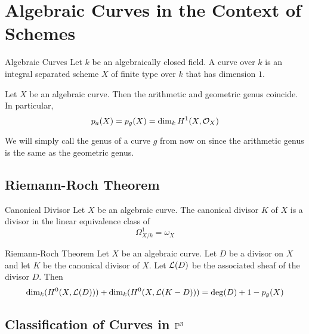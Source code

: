 \documentclass[a4paper]{article}
\begin{document}
\pagebreak
\section{Algebraic Curves in the Context of Schemes}
\begin{defn}{Algebraic Curves}{} Let $k$ be an algebraically closed field. A curve over $k$ is an integral separated scheme $X$ of finite type over $k$ that has dimension $1$. 
\end{defn}

\begin{prp}{}{} Let $X$ be an algebraic curve. Then the arithmetic and geometric genus coincide. In particular, $$p_a(X)=p_g(X)=\dim_kH^1(X,\mathcal{O}_X)$$
\end{prp}

We will simply call the genus of a curve $g$ from now on since the arithmetic genus is the same as the geometric genus. 

\subsection{Riemann-Roch Theorem}
\begin{defn}{Canonical Divisor}{} Let $X$ be an algebraic curve. The canonical divisor $K$ of $X$ is a divisor in the linear equivalence class of $$\Omega_{X/k}^1=\omega_X$$
\end{defn}

\begin{thm}{Riemann-Roch Theorem}{} Let $X$ be an algebraic curve. Let $D$ be a divisor on $X$ and let $K$ be the canonical divisor of $X$. Let $\mathcal{L}(D)$ be the associated sheaf of the divisor $D$. Then $$\dim_k(H^0(X,\mathcal{L}(D)))+\dim_k(H^0(X,\mathcal{L}(K-D)))=\deg(D)+1-p_g(X)$$
\end{thm}

\subsection{Classification of Curves in $\mathbb{P}^3$}
\end{document}
